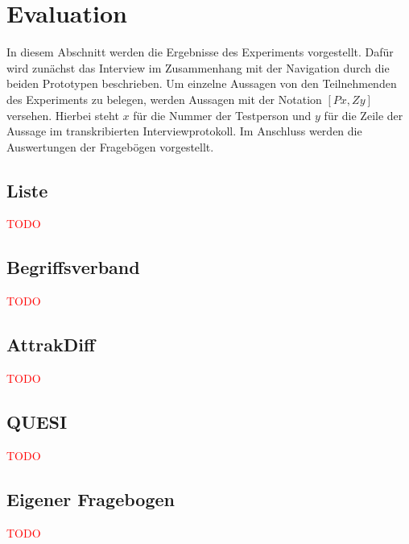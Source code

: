 \section{Evaluation}\label{sec:results}
In diesem Abschnitt werden die Ergebnisse des Experiments vorgestellt.
Dafür wird zunächst das Interview im Zusammenhang mit der Navigation durch die beiden Prototypen beschrieben.
Um einzelne Aussagen von den Teilnehmenden des Experiments zu belegen, werden Aussagen mit der Notation $[Px, Zy]$ versehen.
Hierbei steht $x$ für die Nummer der Testperson und $y$ für die Zeile der Aussage im transkribierten Interviewprotokoll.
Im Anschluss werden die Auswertungen der Fragebögen vorgestellt.

\subsection{Liste}
\textcolor{red}{TODO}
\subsection{Begriffsverband}
\textcolor{red}{TODO}
\subsection{AttrakDiff}
\textcolor{red}{TODO}
\subsection{QUESI}
\textcolor{red}{TODO}
\subsection{Eigener Fragebogen}
\textcolor{red}{TODO}
